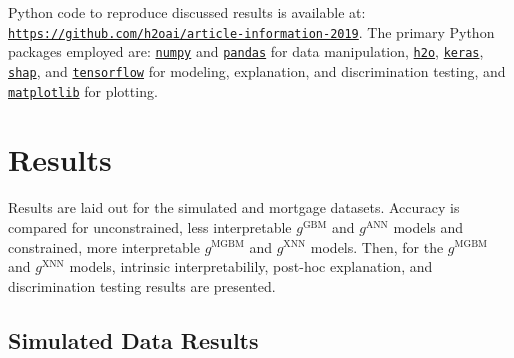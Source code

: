 \documentclass[information,article,submit,moreauthors,pdftex]{definitions/mdpi}
\begin{document}
Python code to reproduce discussed results is available at: \texttt{\url{https://github.com/h2oai/article-information-2019}}. The primary Python packages employed are: \href{https://numpy.org/}{\texttt{numpy}} and \href{https://pandas.pydata.org/}{\texttt{pandas}} for data manipulation, \href{https://github.com/h2oai/h2o-3}{\texttt{h2o}}, \href{https://keras.io/}{\texttt{keras}}, \href{https://github.com/slundberg/shap}{\texttt{shap}}, and \href{https://www.tensorflow.org/}{\texttt{tensorflow}} for modeling, explanation, and discrimination testing, and \href{https://matplotlib.org/}{\texttt{matplotlib}} for plotting. 

\section{Results}\label{sec:res}

Results are laid out for the simulated and mortgage datasets. Accuracy is compared for unconstrained, less interpretable $g^{\text{GBM}}$ and $g^{\text{ANN}}$ models and constrained, more interpretable $g^{\text{MGBM}}$ and $g^{\text{XNN}}$ models. Then, for the  $g^{\text{MGBM}}$ and $g^{\text{XNN}}$ models, intrinsic interpretabilily, post-hoc explanation, and discrimination testing results are presented.

\subsection{Simulated Data Results}
\end{document}
